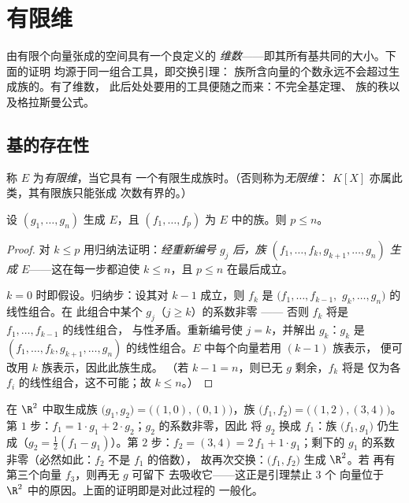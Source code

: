 \chapter{有限维}\label{ch:b1:findim}

由有限个向量张成的空间具有一个良定义的
\emph{维数}——即其所有基共同的大小。下面的证明
均源于同一组合工具，即交换引理：
族所含向量的个数永远不会超过生成族的。有了维数，
此后处处要用的工具便随之而来：不完全基定理、
族的秩以及格拉斯曼公式。

\section{基的存在性}

\begin{definition}\label{def:b1:findim:def}
称 $E$ 为\emph{有限维}，当它具有
一个有限生成族时。（否则称为\emph{无限维}：
$K[X]$ 亦属此类，其有限族只能张成
次数有界的。）
\end{definition}

\begin{theorem}[交换引理]\label{thm:b1:findim:exchange}
设 $(g_1, \dots, g_n)$ 生成 $E$，且 $(f_1, \dots, f_p)$ 为
$E$ 中的族。则 $p \leq n$。
\end{theorem}

\begin{proof}
对 $k \leq p$ 用归纳法证明：\emph{经重新编号
$g_j$ 后，族 $(f_1, \dots, f_k, g_{k+1}, \dots, g_n)$ 生成
$E$}——这在每一步都迫使 $k \leq n$，且 $p \leq n$
在最后成立。

$k = 0$ 时即假设。归纳步：设其对 $k - 1$ 成立，则 $f_k$ 是
$(f_1, \dots, f_{k-1},$ $g_k, \dots, g_n)$ 的线性组合。在
此组合中某个 $g_j$（$j \geq k$）的系数非零
——
否则 $f_k$ 将是 $f_1, \dots, f_{k-1}$ 的线性组合，
与性矛盾。重新编号使 $j = k$，并解出
$g_k$：$g_k$ 是 $(f_1, \dots, f_k, g_{k+1}, \dots,
g_n)$ 的线性组合。$E$ 中每个向量若用 $(k-1)$ 族表示，
便可改用 $k$ 族表示，因此此族生成。
（若 $k - 1 = n$，则已无 $g$ 剩余，$f_k$ 将是
仅为各 $f_i$ 的线性组合，这不可能；故 $k \leq n$。）
\end{proof}

\begin{example}[交换过程的一次演示]
\label{ex:b1:findim:exchangerun}
在 $\R^2$ 中取生成族 $\bigl(g_1, g_2\bigr) =
\bigl((1,0), (0,1)\bigr)$，族 $\bigl(f_1,
f_2\bigr) = \bigl((1,2), (3,4)\bigr)$。第 $1$ 步：$f_1 = 1\cdot
g_1 + 2\cdot g_2$；$g_2$ 的系数非零，因此
将 $g_2$ 换成 $f_1$：族 $\bigl(f_1, g_1\bigr)$
仍生成（$g_2 = \frac12(f_1 - g_1)$）。第 $2$ 步：$f_2 =
(3,4) = 2\,f_1 + 1\cdot g_1$；剩下的
$g_1$ 的系数非零（必然如此：$f_2$ 不是 $f_1$ 的倍数），
故再次交换：$\bigl(f_1, f_2\bigr)$ 生成 $\R^2$。若
再有第三个向量 $f_3$，则再无 $g$ 可留下
去吸收它——这正是引理禁止 $3$ 个
向量位于 $\R^2$ 中的原因。上面的证明即是对此过程的
一般化。
\end{example}


